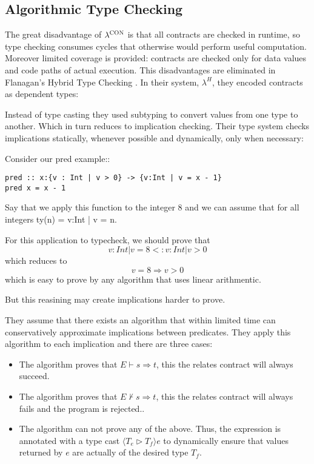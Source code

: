 \subsection{Algorithmic Type Checking}

The great disadvantage of $\lambda^{\textsc{CON}}$ is that all contracts are checked in runtime, 
so type checking consumes cycles that otherwise would perform useful computation.
Moreover limited coverage is provided: contracts are checked only for data values and
code paths of actual execution.
This disadvantages are eliminated in Flanagan's Hybrid Type Checking \cite{Flanagan06}.
In their system, $\lambda^H$, they encoded contracts as dependent types:


Instead of type casting they used subtyping to convert values from one type to another.
Which in turn reduces to implication checking.
Their type system checks implications statically, whenever possible
and dynamically, only when necessary:


Consider our pred example::

\begin{verbatim}
pred :: x:{v : Int | v > 0} -> {v:Int | v = x - 1}
pred x = x - 1
\end{verbatim}

Say that we apply this function to the integer 8
and we can assume that  for all integers ty(n) = {v:Int | v = n}.

For this application to typecheck, we should prove that 
$$ {v:Int | v = 8} <: {v : Int | v > 0} $$
which reduces to 
$$ v = 8 \Rightarrow v > 0 $$
which is easy to prove by any algorithm that uses linear arithmentic.

But this reasining may create implications harder to prove.

They assume that 
there exists an algorithm that within limited time can
conservatively approximate implications between predicates.
They apply this algorithm to each implication and there are three cases:
\begin{itemize}
\item The algorithm proves that $E \vdash s \Rightarrow t$, this the relates contract
will always succeed.
\item The algorithm proves that $E \nvdash s \Rightarrow t$, this the relates contract
will always fails and the program is rejected..
\item The algorithm can not prove any of the above.
Thus, the expression is annotated with a type cast $\langle T_e \vartriangleright T_f\rangle e$
to dynamically ensure that values returned by $e$ are actually of the desired type $T_f$.
\end{itemize}


